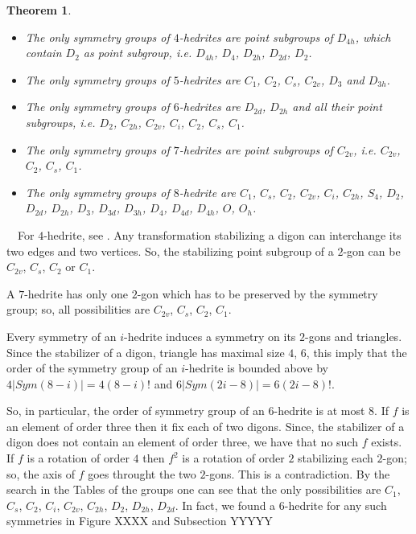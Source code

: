 \documentclass[12pt]{article}
\newtheorem{theor}{Theorem}
\newcommand{\proof}{\noindent{\bf Proof.}\ \ }
\begin{document}
\begin{theor}
\begin{itemize}
\item[(i)] The only symmetry groups of $4$-hedrites are point subgroups of $D_{4h}$, which contain $D_{2}$ as point subgroup, i.e. $D_{4h}$, $D_4$, $D_{2h}$, $D_{2d}$, $D_2$.

\item[(ii)] The only symmetry groups of $5$-hedrites are $C_1$, $C_2$, $C_s$, $C_{2v}$, $D_3$ and $D_{3h}$.

\item[(iii)] The only symmetry groups of $6$-hedrites are $D_{2d}$, $D_{2h}$ and all their point subgroups, i.e. $D_{2}$, $C_{2h}$, $C_{2v}$, $C_i$, $C_{2}$, $C_{s}$, $C_{1}$.

\item[(iv)] The only symmetry groups of $7$-hedrites are point subgroups of $C_{2v}$, i.e. $C_{2v}$, $C_{2}$, $C_{s}$, $C_{1}$.

\item[(v)] The only symmetry groups of $8$-hedrite are $C_{1}$, $C_s$, $C_2$, $C_{2v}$, $C_i$, $C_{2h}$, $S_4$, $D_2$, $D_{2d}$, $D_{2h}$, $D_3$, $D_{3d}$, $D_{3h}$, $D_4$, $D_{4d}$, $D_{4h}$, $O$, $O_h$.

\end{itemize}


\end{theor}
\proof For $4$-hedrite, see \cite{DSt}. Any transformation stabilizing a digon can interchange its two edges and two vertices. So, the stabilizing point subgroup of a $2$-gon can be $C_{2v}$, $C_s$, $C_2$ or $C_1$.

A $7$-hedrite has only one $2$-gon which has to be preserved by the symmetry group; so, all possibilities are $C_{2v}$, $C_s$, $C_2$, $C_1$.

Every symmetry of an $i$-hedrite induces a symmetry on its $2$-gons and triangles. Since the stabilizer of a digon, triangle has maximal size $4$, $6$, this imply that the order of the symmetry group of an $i$-hedrite is bounded above by $4|Sym(8-i)|=4(8-i)!$ and $6|Sym(2i-8)|=6(2i-8)!$.

So, in particular, the order of symmetry group of an $6$-hedrite is at most $8$. If $f$ is an element of order three then it fix each of two digons. Since, the stabilizer of a digon does not contain an element of order three, we have that no such $f$ exists. If $f$ is a rotation of order $4$ then $f^2$ is a rotation of order $2$ stabilizing each $2$-gon; so, the axis of $f$ goes throught the two $2$-gons. This is a contradiction. By the search in the Tables of the groups one can see that the only possibilities are $C_1$, $C_s$, $C_2$, $C_i$, $C_{2v}$, $C_{2h}$, $D_2$, $D_{2h}$, $D_{2d}$. In fact, we found a $6$-hedrite for any such symmetries in Figure XXXX and Subsection YYYYY
\end{document}
